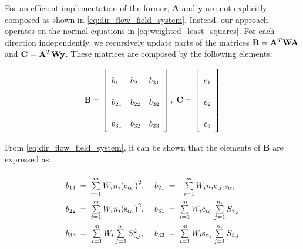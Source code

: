 For an efficient implementation of the former, $\mathbf{A}$ and $\mathbf{y}$ are not explicitly composed as shown in \cref{eq:dir_flow_field_system}. Instead, our approach operates on the normal equations in \cref{eq:weighted_least_squares}. For each direction independently, we recursively update parts of the matrices $\mathbf{B}={{\bf{A}}^T}{\bf{WA}}$ and $\mathbf{C}={{\bf{A}}^T}{\bf{Wy}}$. These matrices are composed by the following elements:

\begin{equation}
\bf{B} = \left[ {\begin{array}{*{20}{c}}
	{{b_{11}}}&{{b_{21}}}&{{b_{31}}}\\
	{{b_{21}}}&{{b_{22}}}&{{b_{32}}}\\
	{{b_{31}}}&{{b_{32}}}&{{b_{33}}}
	\end{array}} \right],\;\mathbf{C} = \left[ {\begin{array}{*{20}{c}}
	{{c_1}}\\
	{{c_2}}\\
	{{c_3}}
	\end{array}} \right]
\end{equation}

From \cref{eq:dir_flow_field_system}, it can be shown that the elements of $\mathbf{B}$ are expressed as:

\begin{equation}
\def\arraystretch{2.2}
\begin{array}{c@{\hspace{0.5em}}c@{\hspace{0.5em}}c@{\hspace{0.5em}}c@{\hspace{0.5em}}c@{\hspace{0.5em}}c@{\hspace{0.5em}}c@{\hspace{0.5em}}}
{b_{11}} &=& \sum\limits_{i=1}^m {{W_i}{n_i}{{\left( {{\rm{c}}_{\alpha _i}} \right)}^2}}, &\;& {b_{21}} &=& \sum\limits_{i=1}^m {{W_i}{n_i}{\rm{c}}_{\alpha _i}{\rm{s}}_{\alpha _i}} \\
{b_{22}} &=& \sum\limits_{i=1}^m {{W_i}{n_i}{{\left( {{\rm{s}}_{\alpha _i}} \right)}^2}}, &\;& {b_{31}} &=& \sum\limits_{i=1}^m {{W_i}{\rm{c}}_{\alpha _i}\sum\limits_{j=1}^{n_i} {S_{i,j}}}  \\
{b_{33}} &=& \sum\limits_{i=1}^m {{W_i}\sum\limits_{j=1}^{n_i} {S_{i,j}^2} }, &\;&{b_{32}} &=& \sum\limits_{i=1}^m {{W_i}{\rm{s}}_{\alpha _i}\sum\limits_{j=1}^{n_i} {{S_{i,j}}}} 
\end{array}
\end{equation}


